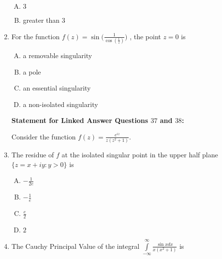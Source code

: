 \documentclass[12pt,a4paper]{article}
\begin{document}
\begin{enumerate}
\begin{enumerate}[(A)]
\item $
3
$

\item 
greater than $3$


\end{enumerate}


\item For the function $ f(z)= \sin \Big( \frac{1}{\cos(\frac{1}{z})} \Big) $ , the point $z=0$ is

\begin{enumerate}[(A)]

\item 
a removable singularity

\item 
a pole

\item 
an essential singularity

\item 
a non-isolated singularity

\end{enumerate}

\begin{center}

\centering\textbf{Statement for Linked Answer Questions $37$ and $38$:}

\end{center}

Consider the function $f(z) = \frac{e^{iz}}{z(z^2+1)}$.

\item The residue of $f$ at the isolated singular point in the upper half plane 
$ \lbrace z=x+iy : y>0 \rbrace $ is

\begin{enumerate}[(A)]

\item $
-\frac{1}{2e}
$

\item $
-\frac{1}{e}
$

\item $
\frac{e}{2}
$

\item $
2
$

\end{enumerate}

\item The Cauchy Principal Value of the integral $\int\limits_{-\infty}^{\infty} \frac{\sin x dx}{x(x^2+1)} $ is


\begin{enumerate}[(A)]


\end{enumerate}
\end{enumerate}
\end{document}
